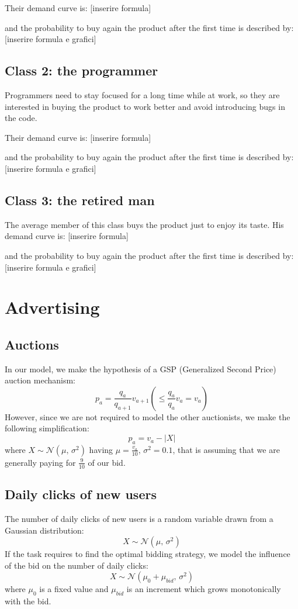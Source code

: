 \documentclass[12pt,a4paper]{report}
\begin{document}
Their demand curve is: [inserire formula]

and the probability to buy again the product after the first time is described by: [inserire formula e grafici]
			\subsection{Class 2: the programmer}
Programmers need to stay focused for a long time while at work, so they are interested in buying the product to work better and avoid introducing bugs in the code.

Their demand curve is: [inserire formula]

and the probability to buy again the product after the first time is described by: [inserire formula e grafici]
			\subsection{Class 3: the retired man}
The average member of this class buys the product just to enjoy its taste.
His demand curve is: [inserire formula]

and the probability to buy again the product after the first time is described by: [inserire formula e grafici]

		\section{Advertising}
			\subsection{Auctions}
In our model, we make the hypothesis of a GSP (Generalized Second Price) auction mechanism:
	\[p_a= \frac{q_a}{q_{a+1}}v_{a+1} \left( \leq\frac{q_a}{q_a}v_a = v_a\right)\]
However, since we are not required to model the other auctionists, we make the following simplification:
	\[  p_a = v_a - |X|\] 
where $ X\sim \mathcal{N}(\mu,\,\sigma^{2})$ having $\mu = \frac{v_a}{10} ,\,\sigma^{2} = 0.1$,
that is assuming that we are generally paying for $\frac 9 {10}$ of our bid.
			\subsection{Daily clicks of new users}
The number of daily clicks of new users is a random variable drawn from a Gaussian distribution:
\[ X\sim \mathcal{N}(\mu,\,\sigma^{2})\]
If the task requires to find the optimal bidding strategy, we model the influence of the bid on the number of daily clicks:
\[ X\sim \mathcal{N}(\mu_0+\mu_{bid},\,\sigma^{2})\]
where $\mu_0$ is a fixed value and $\mu_{bid}$ is an increment which grows monotonically with the bid.
\end{document}

